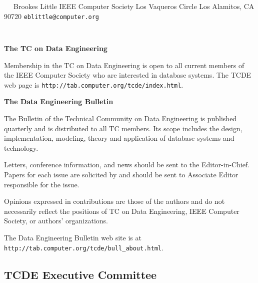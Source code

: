 \documentclass[10pt,twocolumn]{article}
\begin{document}
\begin{description}[style=unboxed,leftmargin=.2cm]
\item[{\bf Distribution}]      
\verb-  -                      \newline
Brookes Little           \newline
IEEE Computer Society           Los Vaqueros Circle       \newline
Los Alamitos, CA 90720     \newline
\verb+eblittle@computer.org+     \newline
\vspace{-1cm}		            
\end{description}


\verb-  -                     	\newline
\noindent
\begin{footnotesize}
{\bf The TC on Data Engineering}

Membership in the TC on Data Engineering
is open to all current members of the IEEE Computer
Society who are interested in database systems.
The TCDE web page is 
\verb+http://tab.computer.org/tcde/index.html+.

\noindent 
{\bf The Data Engineering Bulletin}

The Bulletin of the Technical Community on
Data Engineering is published quarterly and is
distributed to all TC members.  Its
scope includes the design, implementation, 
modeling, theory and application of database 
systems and technology.  

Letters, conference information, and news
should be sent to the Editor-in-Chief.
Papers for each issue are
solicited by and should be sent to
Associate Editor responsible for the issue.

Opinions expressed in contributions are those
of the authors and do not necessarily reflect
the positions of TC on Data Engineering, IEEE Computer Society, or authors'
organizations.

The Data Engineering Bulletin web site is at
\newline
\verb+http://tab.computer.org/tcde/bull_about.html+.
\end{footnotesize}

\subsection*{TCDE Executive Committee}
\end{document}
